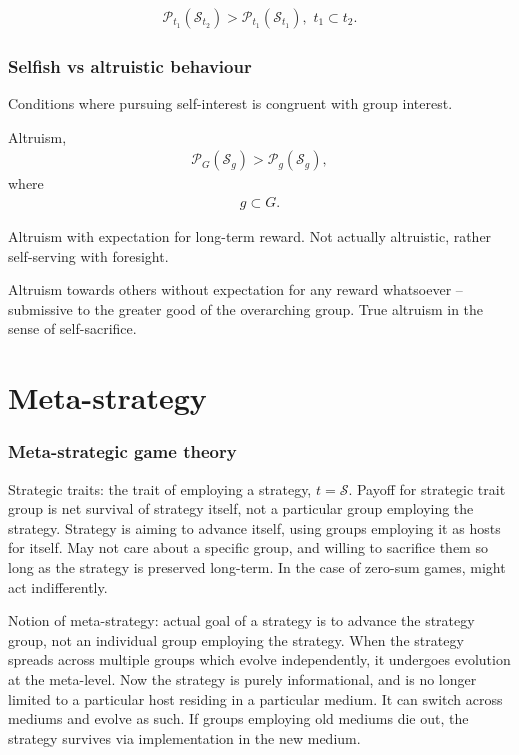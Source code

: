 \documentclass[twocolumn, aps, rmp, amsmath, amssymb, nofootinbib, superscriptaddress, longbibliography, floatfix, table-of-contents, eqsecnum]{revtex4-1}
\begin{document}
\begin{align}
\mathcal{P}_{t_1}(\mathcal{S}_{t_2}) > \mathcal{P}_{t_1}(\mathcal{S}_{t_1}), \,\,t_1\subset t_2.
\end{align}

\section{Selfish vs altruistic behaviour}

Conditions where pursuing self-interest is congruent with group interest.

Altruism,
\begin{align}
\mathcal{P}_G(\mathcal{S}_g) > \mathcal{P}_g(\mathcal{S}_g),
\end{align}
where
\begin{align}
	g \subset G.
\end{align}

Altruism with expectation for long-term reward. Not actually altruistic, rather self-serving with foresight.

Altruism towards others without expectation for any reward whatsoever -- submissive to the greater good of the overarching group. True altruism in the sense of self-sacrifice.

%
%

\part{Meta-strategy}

\section{Meta-strategic game theory}

Strategic traits: the trait of employing a strategy, $t=\mathcal{S}$. Payoff for strategic trait group is net survival of strategy itself, not a particular group employing the strategy. Strategy is aiming to advance itself, using groups employing it as hosts for itself. May not care about a specific group, and willing to sacrifice them so long as the strategy is preserved long-term. In the case of zero-sum games, might act indifferently.

Notion of meta-strategy: actual goal of a strategy is to advance the strategy group, not an individual group employing the strategy. When the strategy spreads across multiple groups which evolve independently, it undergoes evolution at the meta-level. Now the strategy is purely informational, and is no longer limited to a particular host residing in a particular medium. It can switch across mediums and evolve as such. If groups employing old mediums die out, the strategy survives via implementation in the new medium.
\end{document}
